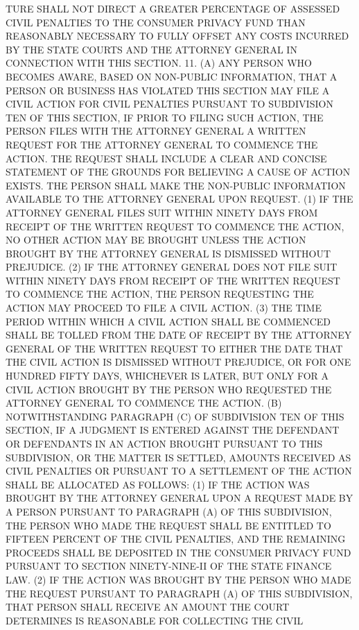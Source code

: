 TURE SHALL NOT DIRECT A GREATER PERCENTAGE OF ASSESSED  CIVIL  PENALTIES
 TO  THE  CONSUMER PRIVACY FUND THAN REASONABLY NECESSARY TO FULLY OFFSET
 ANY COSTS INCURRED BY THE STATE  COURTS  AND  THE  ATTORNEY  GENERAL  IN
 CONNECTION WITH THIS SECTION.
   11. (A) ANY PERSON WHO BECOMES AWARE, BASED ON NON-PUBLIC INFORMATION,
 THAT  A  PERSON  OR  BUSINESS HAS VIOLATED THIS SECTION MAY FILE A CIVIL
 ACTION FOR CIVIL PENALTIES PURSUANT TO SUBDIVISION TEN OF THIS  SECTION,
 IF  PRIOR  TO  FILING  SUCH  ACTION,  THE PERSON FILES WITH THE ATTORNEY
 GENERAL A WRITTEN REQUEST FOR  THE  ATTORNEY  GENERAL  TO  COMMENCE  THE
 ACTION.  THE  REQUEST SHALL INCLUDE A CLEAR AND CONCISE STATEMENT OF THE
 GROUNDS FOR BELIEVING A CAUSE OF ACTION EXISTS. THE  PERSON  SHALL  MAKE
 THE  NON-PUBLIC  INFORMATION  AVAILABLE  TO  THE  ATTORNEY  GENERAL UPON
 REQUEST.
   (1) IF THE ATTORNEY GENERAL FILES SUIT WITHIN NINETY DAYS FROM RECEIPT
 OF THE WRITTEN REQUEST TO COMMENCE THE ACTION, NO OTHER  ACTION  MAY  BE
 BROUGHT  UNLESS  THE ACTION BROUGHT BY THE ATTORNEY GENERAL IS DISMISSED
 WITHOUT PREJUDICE.
   (2) IF THE ATTORNEY GENERAL DOES NOT FILE SUIT WITHIN NINETY DAYS FROM
 RECEIPT OF THE WRITTEN  REQUEST  TO  COMMENCE  THE  ACTION,  THE  PERSON
 REQUESTING THE ACTION MAY PROCEED TO FILE A CIVIL ACTION.
   (3)  THE  TIME  PERIOD  WITHIN WHICH A CIVIL ACTION SHALL BE COMMENCED
 SHALL BE TOLLED FROM THE DATE OF RECEIPT BY THE ATTORNEY GENERAL OF  THE
 WRITTEN  REQUEST  TO  EITHER THE DATE THAT THE CIVIL ACTION IS DISMISSED
 WITHOUT PREJUDICE, OR FOR ONE HUNDRED FIFTY DAYS,  WHICHEVER  IS  LATER,
 BUT  ONLY  FOR  A  CIVIL  ACTION BROUGHT BY THE PERSON WHO REQUESTED THE
 ATTORNEY GENERAL TO COMMENCE THE ACTION.
   (B) NOTWITHSTANDING PARAGRAPH (C) OF SUBDIVISION TEN OF THIS  SECTION,
 IF  A  JUDGMENT  IS  ENTERED  AGAINST  THE DEFENDANT OR DEFENDANTS IN AN
 ACTION BROUGHT PURSUANT TO THIS SUBDIVISION, OR THE MATTER  IS  SETTLED,
 AMOUNTS  RECEIVED  AS CIVIL PENALTIES OR PURSUANT TO A SETTLEMENT OF THE
 ACTION SHALL BE ALLOCATED AS FOLLOWS:
   (1) IF THE ACTION WAS BROUGHT BY THE ATTORNEY GENERAL UPON  A  REQUEST
 MADE  BY  A  PERSON  PURSUANT  TO PARAGRAPH (A) OF THIS SUBDIVISION, THE
 PERSON WHO MADE THE REQUEST SHALL BE ENTITLED TO FIFTEEN PERCENT OF  THE
 CIVIL  PENALTIES,  AND  THE REMAINING PROCEEDS SHALL BE DEPOSITED IN THE
 CONSUMER PRIVACY FUND PURSUANT TO SECTION NINETY-NINE-II  OF  THE  STATE
 FINANCE LAW.
   (2)  IF  THE  ACTION  WAS  BROUGHT  BY THE PERSON WHO MADE THE REQUEST
 PURSUANT TO PARAGRAPH (A) OF THIS SUBDIVISION, THAT PERSON SHALL RECEIVE
 AN AMOUNT THE COURT DETERMINES IS REASONABLE FOR  COLLECTING  THE  CIVIL
